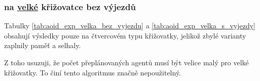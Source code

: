 

\subsubsection{ na \hyperref[par:data_velka]{velké} křižovatce bez výjezdů}
\label{subsubsec:exp_aoid_velka_krizovatka_bez_vyjezdu}

Tabulky \ref{tab:aoid_exp_velka_bez_vyjezdu} a \ref{tab:aoid_exp_velka_s_vyjezdy} obsahují výsledky
pouze na čtvercovém typu křižovatky, jelikož zbylé varianty zaplnily paměť a selhaly.

Z toho usuzuji, že počet přeplánovaných agentů musí být velice malý pro velké křižovatky.
To činí tento algoritmus značně nepoužitelný.




